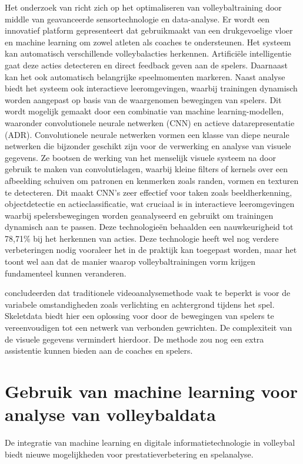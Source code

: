 Het onderzoek van \textcite{Salim2024} richt zich op het optimaliseren van volleybaltraining door middle van geavanceerde sensortechnologie en data-analyse. Er wordt een innovatief platform gepresenteert dat gebruikmaakt van een drukgevoelige vloer en machine learning om zowel atleten als coaches te ondersteunen. Het systeem kan automatisch verschillende volleybalacties herkennen. Artificiële intelligentie gaat deze acties detecteren en direct feedback geven aan de spelers. Daarnaast kan het ook automatisch belangrijke speelmomenten markeren.
Naast analyse biedt het systeem ook interactieve leeromgevingen, waarbij trainingen dynamisch worden aangepast op basis van de waargenomen bewegingen van spelers. Dit wordt mogelijk gemaakt door een combinatie van machine learning-modellen, waaronder convolutionele neurale netwerken (CNN) en actieve datarepresentatie (ADR). Convolutionele neurale netwerken vormen een klasse van diepe neurale netwerken die bijzonder geschikt zijn voor de verwerking en analyse van visuele gegevens. Ze bootsen de werking van het menselijk visuele systeem na door gebruik te maken van convolutielagen, waarbij kleine filters of kernels over een afbeelding schuiven om patronen en kenmerken zoals randen, vormen en texturen te detecteren. Dit maakt CNN's zeer effectief voor taken zoals beeldherkenning, objectdetectie en actieclassificatie, wat cruciaal is in interactieve leeromgevingen waarbij spelersbewegingen worden geanalyseerd en gebruikt om trainingen dynamisch aan te passen. Deze technologieën behaalden een nauwkeurigheid tot 78,71\% bij het herkennen van acties.
Deze technologie heeft wel nog verdere verbeteringen nodig vooraleer het in de praktijk kan toegepast worden, maar het toont wel aan dat de manier waarop volleybaltrainingen vorm krijgen fundamenteel kunnen veranderen.

\textcite{Liang2023} concludeerden dat traditionele videoanalysemethode vaak te beperkt is voor de variabele omstandigheden zoals verlichting en achtergrond tijdens het spel. Skeletdata biedt hier een oplossing voor door de bewegingen van spelers te vereenvoudigen tot een netwerk van verbonden gewrichten. De complexiteit van de visuele gegevens vermindert hierdoor. De methode zou nog een extra assistentie kunnen bieden aan de coaches en spelers.

\section{Gebruik van machine learning voor analyse van volleybaldata}
De integratie van machine learning en digitale informatietechnologie in volleybal biedt nieuwe mogelijkheden voor prestatieverbetering en spelanalyse.

